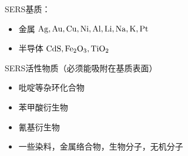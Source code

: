 SERS基质： 
\begin{itemize}

	\item     金属    $\ce{Ag},\ce{ Au}, \ce{Cu},\ce{Ni},\ce{ Al},\ce{ Li},\ce{ Na,} \ce{K}, \ce{Pt}$
	\item     半导体  $\ce{CdS}, \ce{Fe_{2}O_{3}}, \ce{TiO_{2}}$

\end{itemize}


SERS活性物质（必须能吸附在基质表面）
\begin{itemize}
	\item 	吡啶等杂环化合物
	\item   苯甲酸衍生物
	\item   氰基衍生物
	\item   一些染料，金属络合物，生物分子，无机分子
\end{itemize}